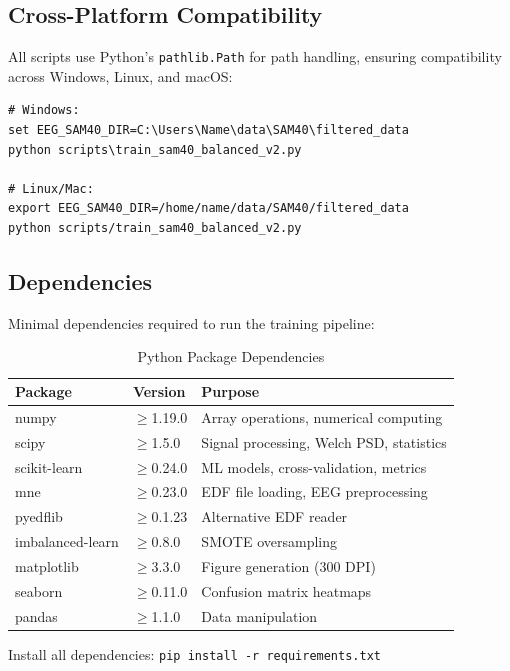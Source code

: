 \documentclass[11pt,a4paper]{article}
\begin{document}
\subsection{Cross-Platform Compatibility}

All scripts use Python's \texttt{pathlib.Path} for path handling, ensuring compatibility across Windows, Linux, and macOS:

\begin{verbatim}
# Windows:
set EEG_SAM40_DIR=C:\Users\Name\data\SAM40\filtered_data
python scripts\train_sam40_balanced_v2.py

# Linux/Mac:
export EEG_SAM40_DIR=/home/name/data/SAM40/filtered_data
python scripts/train_sam40_balanced_v2.py
\end{verbatim}

\subsection{Dependencies}

Minimal dependencies required to run the training pipeline:

\begin{table}[H]
\centering
\caption{Python Package Dependencies}
\small
\begin{tabular}{lll}
\toprule
\textbf{Package} & \textbf{Version} & \textbf{Purpose} \\
\midrule
numpy & $\geq$1.19.0 & Array operations, numerical computing \\
scipy & $\geq$1.5.0 & Signal processing, Welch PSD, statistics \\
scikit-learn & $\geq$0.24.0 & ML models, cross-validation, metrics \\
mne & $\geq$0.23.0 & EDF file loading, EEG preprocessing \\
pyedflib & $\geq$0.1.23 & Alternative EDF reader \\
imbalanced-learn & $\geq$0.8.0 & SMOTE oversampling \\
matplotlib & $\geq$3.3.0 & Figure generation (300 DPI) \\
seaborn & $\geq$0.11.0 & Confusion matrix heatmaps \\
pandas & $\geq$1.1.0 & Data manipulation \\
\bottomrule
\end{tabular}
\end{table}

\noindent Install all dependencies: \texttt{pip install -r requirements.txt}
\end{document}
